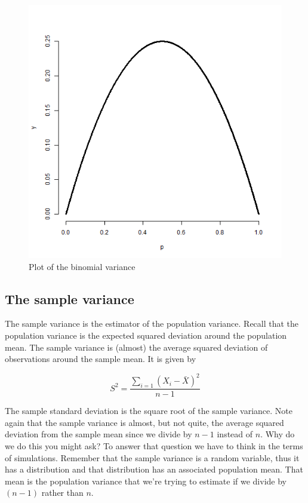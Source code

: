 \documentclass[]{article}
\begin{document}
\begin{figure}[htbp]
\centering
\includegraphics{LeanPub/images/binomialVariance-1.png}
\caption{Plot of the binomial variance}
\end{figure}

\subsection{The sample variance}\label{the-sample-variance}

The sample variance is the estimator of the population variance. Recall
that the population variance is the expected squared deviation around
the population mean. The sample variance is (almost) the average squared
deviation of observations around the sample mean. It is given by

\[
S^2 = \frac{\sum_{i=1} (X_i - \bar X)^2}{n-1}
\]

The sample standard deviation is the square root of the sample variance.
Note again that the sample variance is almost, but not quite, the
average squared deviation from the sample mean since we divide by $n-1$
instead of $n$. Why do we do this you might ask? To answer that question
we have to think in the terms of simulations. Remember that the sample
variance is a random variable, thus it has a distribution and that
distribution has an associated population mean. That mean is the
population variance that we're trying to estimate if we divide by
$(n-1)$ rather than $n$.
\end{document}
